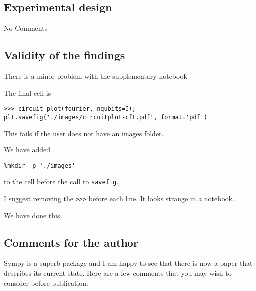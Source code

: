 \documentclass[answers,12pt]{exam}
\begin{document}
\subsection{Experimental design}
No Comments

\subsection{Validity of the findings}
\begin{questions}
\question There is a minor problem with the supplementary notebook

The final cell is

\begin{verbatim}
>>> circuit_plot(fourier, nqubits=3);
plt.savefig('./images/circuitplot-qft.pdf', format='pdf')
\end{verbatim}

This fails if the user does not have an images folder.
\begin{solution}
We have added

\begin{verbatim}
%mkdir -p './images'
\end{verbatim}

to the cell before the call to \verb|savefig|.
\end{solution}

\question I suggest removing the \verb|>>>| before each line. It looks strange in a notebook.
\begin{solution}
We have done this.
\end{solution}
\end{questions}
\subsection{Comments for the author}
Sympy is a superb package and I am happy to see that there is now a paper that describes its current state. Here are a few comments that you may wish to consider before publication.
\end{document}
